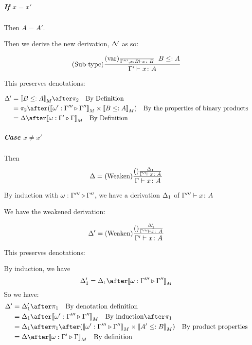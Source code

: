 \documentclass{report}
\begin{document}
        \subparagraph{If $x = x'$}

        Then $A = A'$.

        Then we derive the new derivation, $\Delta'$ as so:

        \begin{equation}
            (\text{Sub-type}) \frac{
                (\text{var}) \frac{}{\Gamma''', x: B \vdash x \colon B}
                \;\;
                B \leq: A
            }{
                \Gamma' \vdash x \colon A
            }
        \end{equation}

        This preserves denotations:

        \begin{align}
            \D' & = \deno{B\subtype A}\after\pp\qt{By Definition} \\
             & = \pp\after (\deno{\wrel{\w'}{\G'''}{\G''}}\times \deno{B\subtype A}) \qt{By the properties of binary products}\\
             & = \D\after\deno{\wrel{\w}{\G'}{\G}}\qt{By Definition}
        \end{align}

        \subparagraph{Case $x \neq x'$}
        Then 
        \begin{equation}
            \Delta = (\text{Weaken}) \frac{(\text{}) \frac{\Delta_1}{\Gamma'' \vdash x \colon A}}{\Gamma \vdash x \colon A}
        \end{equation}

        By induction with $\omega : \Gamma''' \triangleright \Gamma''$,
         we have a derivation $\Delta_1$ of $\Gamma''' \vdash x \colon A$

        We have the weakened derivation:

        \begin{equation}
            \Delta' = (\text{Weaken}) \frac{(\text{}) \frac{\Delta_1'}{\Gamma''' \vdash x \colon A}}{\Gamma' \vdash x \colon A}
        \end{equation}

        This preserves denotations:

        By induction, we have
        \begin{equation}
            \D_1' = \D_1 \after \deno{\wrel{\w}{\G'''}{\G''}}
        \end{equation}
        So we have:
        \begin{align}
            \D' &= \D_1' \after \p\qt{By denotation definition}\\
            & = \D_1\after\deno{\wrel{\w'}{\G'''}{\G''}}\qt{By induction}\after\p \\
            & = \D_1\after\p\after(\deno{\wrel{\w'}{\G'''}{\G''}}\times\deno{A' \subtype B})\qt{By product properties}\\
            & = \D\after\deno{\wrel{\w}{\G'}{\G}}\qt{By definition}
        \end{align}
\end{document}
